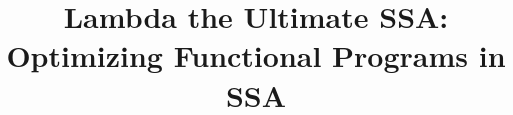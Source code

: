\documentclass[conference]{IEEEtran}
\begin{document}
\title{Lambda the Ultimate SSA:\\Optimizing Functional Programs in SSA}                     %


\end{document}
